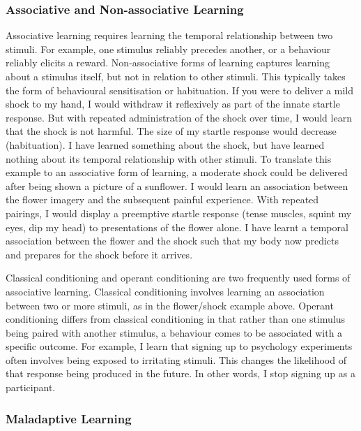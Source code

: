 \documentclass[
  jou,
  floatsintext,
  longtable,
  nolmodern,
  notxfonts,
  notimes,
  donotrepeattitle,
  colorlinks=true,linkcolor=blue,citecolor=blue,urlcolor=blue]{apa7}
\begin{document}
\subsubsection{Associative and Non-associative
Learning}\label{associative-and-non-associative-learning}

Associative learning requires learning the temporal relationship between
two stimuli. For example, one stimulus reliably precedes another, or a
behaviour reliably elicits a reward. Non-associative forms of learning
captures learning about a stimulus itself, but not in relation to other
stimuli. This typically takes the form of behavioural sensitisation or
habituation. If you were to deliver a mild shock to my hand, I would
withdraw it reflexively as part of the innate startle response. But with
repeated administration of the shock over time, I would learn that the
shock is not harmful. The size of my startle response would decrease
(habituation). I have learned something about the shock, but have
learned nothing about its temporal relationship with other stimuli. To
translate this example to an associative form of learning, a moderate
shock could be delivered after being shown a picture of a sunflower. I
would learn an association between the flower imagery and the subsequent
painful experience. With repeated pairings, I would display a preemptive
startle response (tense muscles, squint my eyes, dip my head) to
presentations of the flower alone. I have learnt a temporal association
between the flower and the shock such that my body now predicts and
prepares for the shock before it arrives.

Classical conditioning and operant conditioning are two frequently used
forms of associative learning. Classical conditioning involves learning
an association between two or more stimuli, as in the flower/shock
example above. Operant conditioning differs from classical conditioning
in that rather than one stimulus being paired with another stimulus, a
behaviour comes to be associated with a specific outcome. For example, I
learn that signing up to psychology experiments often involves being
exposed to irritating stimuli. This changes the likelihood of that
response being produced in the future. In other words, I stop signing up
as a participant.

\subsubsection{Maladaptive Learning}\label{maladaptive-learning}
\end{document}
